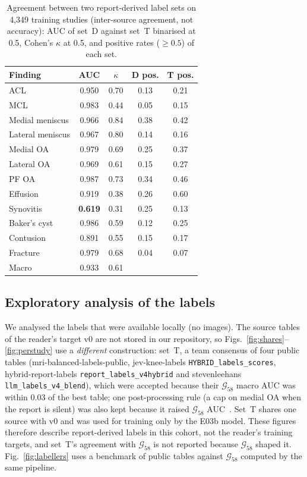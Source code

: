 \documentclass{ieeeaccess}
\newcommand{\gold}{$\mathcal{G}_{58}$}
\begin{document}
\begin{table}[!t]
\centering
\caption{Agreement between two report-derived label sets on 4,349 training studies (inter-source agreement, not accuracy):
AUC of set~D against set~T binarised at 0.5, Cohen's $\kappa$ at 0.5, and positive rates ($\geq0.5$) of each set.}
\label{tab:labels}
\setlength{\tabcolsep}{4pt}
\begin{tabular}{lcccc}
\toprule
Finding & AUC & $\kappa$ & D pos. & T pos.\\
\midrule
ACL & 0.950 & 0.70 & 0.13 & 0.21\\
MCL & 0.983 & 0.44 & 0.05 & 0.15\\
Medial meniscus & 0.966 & 0.84 & 0.38 & 0.42\\
Lateral meniscus & 0.967 & 0.80 & 0.14 & 0.16\\
Medial OA & 0.979 & 0.69 & 0.25 & 0.37\\
Lateral OA & 0.969 & 0.61 & 0.15 & 0.27\\
PF OA & 0.987 & 0.73 & 0.34 & 0.46\\
Effusion & 0.919 & 0.38 & 0.26 & 0.60\\
Synovitis & \textbf{0.619} & 0.31 & 0.25 & 0.13\\
Baker's cyst & 0.986 & 0.59 & 0.12 & 0.25\\
Contusion & 0.891 & 0.55 & 0.15 & 0.17\\
Fracture & 0.979 & 0.68 & 0.04 & 0.07\\
\midrule
Macro & 0.933 & 0.61 & & \\
\bottomrule
\end{tabular}
\end{table}

\subsection{Exploratory analysis of the labels}
\label{sec:data-eda}
We analysed the labels that were available locally (no images). The source tables of the reader's target v0 are not
stored in our repository, so Figs.~\ref{fig:shares}--\ref{fig:perstudy} use a \emph{different} construction: set~T, a
team consensus of four public tables (mri-balanced-labels-public, jev-knee-labels \texttt{HYBRID\_labels\_scores},
hybrid-report-labels \texttt{report\_labels\_v4hybrid} and stevenleehans \texttt{llm\_labels\_v4\_blend}), which were
accepted because their \gold{} macro AUC was within 0.03 of the best table; one post-processing rule (a cap on medial OA
when the report is silent) was also kept because it raised \gold{} AUC~\cite{hack2publish2026repo}. Set~T shares one
source with v0 and was used for training only by the E03b model. These figures therefore describe report-derived labels
in this cohort, not the reader's training targets, and set~T's agreement with \gold{} is not reported because \gold{}
shaped it. Fig.~\ref{fig:labellers} uses a benchmark of public tables against \gold{} computed by the same pipeline.
\end{document}
